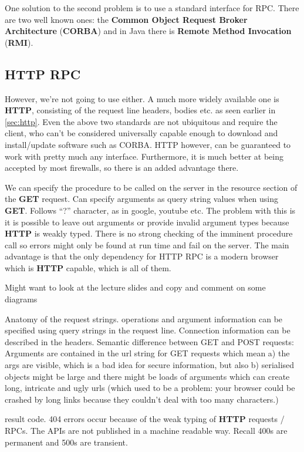 \documentclass[11pt]{article}
\begin{document}
One solution to the second problem is to use a standard interface for RPC. There are two well known ones: the \textbf{Common Object Request Broker Architecture} (\textbf{CORBA}) and in Java there is \textbf{Remote Method Invocation} (\textbf{RMI}).

\subsection{HTTP RPC}
However, we’re not going to use either. A much more widely available one is \textbf{HTTP}, consisting of the request line headers, bodies etc. as seen earlier in \ref{sec:http}. Even the above two standards are not ubiquitous and require the client, who can’t be considered universally capable enough to download and install/update software such as CORBA. HTTP however, can be guaranteed to work with pretty much any interface. Furthermore, it is much better at being accepted by most firewalls, so there is an added advantage there.

We can specify the procedure to be called on the server in the resource section of the \textbf{GET} request.
Can specify arguments as query string values when using \textbf{GET}. Follows “?” character, as in google, youtube etc. The problem with this is it is possible to leave out arguments or provide invalid argument types because \textbf{HTTP} is weakly typed. There is no strong checking of the imminent procedure call so errors might only be found at run time and fail on the server. The main advantage is that the only dependency for HTTP RPC is a modern browser which is \textbf{HTTP} capable, which is all of them.

Might want to look at the lecture slides and copy and comment on some diagrams

Anatomy of the request strings.
operations and argument information can be specified using query strings in the request line.
Connection information can be described in the headers.
Semantic difference between GET and POST requests: Arguments are contained in the url string for GET requests which mean a) the args are visible, which is a bad idea for secure information, but also b) serialised objects might be large and there might be loads of arguments which can create long, intricate and ugly urls (which used to be a problem: your browser could be crashed by long links because they couldn't deal with too many characters.)

result code.
404 errors occur because of the weak typing of \textbf{HTTP} requests / RPCs. The APIs are not published in a machine readable way. Recall 400s are permanent and 500s are transient.
\end{document}
